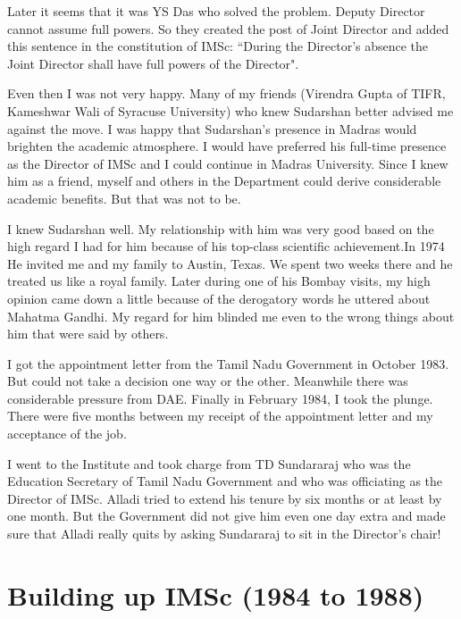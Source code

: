 Later it seems that it was YS Das who solved the problem. Deputy 
Director cannot assume full powers. So they created the post of Joint 
Director and added this sentence in the constitution of IMSc: ``During 
the Director's absence the Joint Director shall have full powers of the 
Director".

Even then I was not very happy. Many of my friends (Virendra Gupta of 
TIFR, Kameshwar Wali of Syracuse University) who knew Sudarshan better 
advised me against the move. I was happy that Sudarshan's presence in 
Madras would brighten the academic atmosphere. I would have preferred 
his full-time presence as the Director of IMSc and I could continue in 
Madras University. Since I knew him as a friend, myself and others in 
the Department could derive considerable academic benefits. But that was 
not to be.

I knew Sudarshan well. My relationship with him was very good based on 
the high regard I had for him because of his top-class scientific 
achievement.In 1974 He invited me and my family to Austin, Texas. We 
spent two weeks there and he treated us like a royal family. Later 
during one of his Bombay visits, my high opinion came down a little 
because of the derogatory words he uttered about Mahatma Gandhi. My 
regard for him blinded me even to the wrong things about him that were 
said by others.

I got the appointment letter from the Tamil Nadu Government in October 
1983. But could not take a decision one way or the other. Meanwhile 
there was considerable pressure from DAE. Finally in February 1984, I 
took the plunge. There were five months between my receipt of the 
appointment letter and my acceptance of the job.

I went to the Institute and took charge from TD Sundararaj who was the 
Education Secretary of Tamil Nadu Government and who was officiating as 
the Director of IMSc. Alladi tried to extend his tenure by six months or 
at least by one month. But the Government did not give him even one day 
extra and made sure that Alladi really quits by asking Sundararaj to sit 
in the Director's chair!
 

\section*{Building up IMSc (1984 to 1988)}


